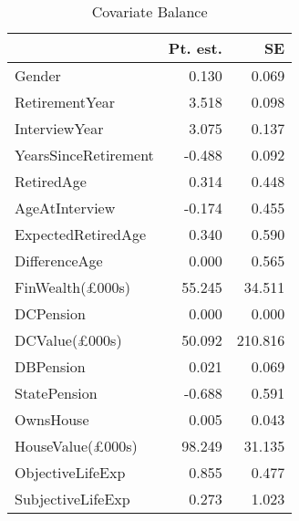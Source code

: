 \begin{table}

\caption{Covariate Balance \label{tab:cov_balance}}
\centering
\begin{tabular}[t]{lrr}
\toprule
 & Pt. est. & SE\\
\midrule
Gender & 0.130 & 0.069\\
RetirementYear & 3.518 & 0.098\\
InterviewYear & 3.075 & 0.137\\
YearsSinceRetirement & -0.488 & 0.092\\
RetiredAge & 0.314 & 0.448\\
\addlinespace
AgeAtInterview & -0.174 & 0.455\\
ExpectedRetiredAge & 0.340 & 0.590\\
DifferenceAge & 0.000 & 0.565\\
FinWealth(£000s) & 55.245 & 34.511\\
DCPension & 0.000 & 0.000\\
\addlinespace
DCValue(£000s) & 50.092 & 210.816\\
DBPension & 0.021 & 0.069\\
StatePension & -0.688 & 0.591\\
OwnsHouse & 0.005 & 0.043\\
HouseValue(£000s) & 98.249 & 31.135\\
\addlinespace
ObjectiveLifeExp & 0.855 & 0.477\\
SubjectiveLifeExp & 0.273 & 1.023\\
\bottomrule
\end{tabular}
\end{table}
